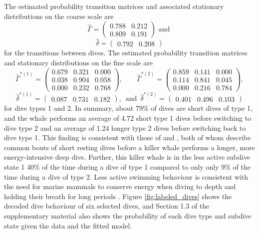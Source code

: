 The estimated probability transition matrices and associated stationary distributions on the coarse scale are
%
$$\hat \Gamma = \begin{pmatrix} 
0.788 & 0.212 \\
0.809 & 0.191
\end{pmatrix} \text{ and }$$
$$\hat \delta = \begin{pmatrix} 0.792 & 0.208 \end{pmatrix}$$
%
for the transitions between dives. The estimated probability transition matrices and stationary distributions on the fine scale are 
$$\hat \Gamma^{*(1)} = \begin{pmatrix} 
0.679 & 0.321 & 0.000 \\
0.038 & 0.904 & 0.058 \\
0.000 & 0.232 & 0.768
\end{pmatrix}, \qquad 
\hat \Gamma^{*(2)} = \begin{pmatrix} 
0.859 & 0.141 & 0.000 \\
0.114 & 0.841 & 0.045 \\
0.000 & 0.216 & 0.784
\end{pmatrix},$$
$$\hat \delta^{*(1)} = \begin{pmatrix} 0.087 & 0.731 & 0.182 \end{pmatrix}, \enspace \text{and} \enspace \hat \delta^{*(2)} = \begin{pmatrix} 0.401 & 0.496 & 0.103 \end{pmatrix}$$
%
for dive types 1 and 2.
In summary, about 79\% of dives are short dives of type 1, and
the whale performs an average of 4.72 short type 1 dives before switching to dive type 2 and an average of 1.24 longer type 2 dives before switching back to dive type 1. This finding is consistent with those of \citet{Tennessen:2019b} and \citet{Williams:2009}, both of whom describe common bouts of short resting dives before a killer whale performs a longer, more energy-intensive deep dive. %
Further, this killer whale is in the less active subdive state 1 40\% of the time during a dive of type 1 compared to only only 9\% of the time during a dive of type 2. Less active swimming behaviour is consistent with the need for marine mammals to conserve energy when diving to depth and holding their breath for long periods \citep{Williams:1999,Hastie:2006}. Figure \ref{fig:labeled_dives} shows the decoded dive behaviour of six selected dives, and Section 1.3 of the supplementary material also shows the probability of each dive type and subdive state given the data and the fitted model.

